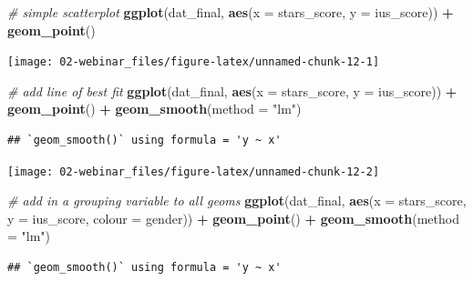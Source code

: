\documentclass[
  oneside]{book}
\newenvironment{Shaded}{\begin{snugshade}}{\end{snugshade}}
\newcommand{\AttributeTok}[1]{\textcolor[rgb]{0.13,0.29,0.53}{#1}}
\newcommand{\CommentTok}[1]{\textcolor[rgb]{0.56,0.35,0.01}{\textit{#1}}}
\newcommand{\FunctionTok}[1]{\textcolor[rgb]{0.13,0.29,0.53}{\textbf{#1}}}
\newcommand{\NormalTok}[1]{#1}
\newcommand{\SpecialCharTok}[1]{\textcolor[rgb]{0.81,0.36,0.00}{\textbf{#1}}}
\newcommand{\StringTok}[1]{\textcolor[rgb]{0.31,0.60,0.02}{#1}}
\begin{document}
\begin{Shaded}
\begin{Highlighting}[]
\CommentTok{\# simple scatterplot}
\FunctionTok{ggplot}\NormalTok{(dat\_final, }\FunctionTok{aes}\NormalTok{(}\AttributeTok{x =}\NormalTok{ stars\_score, }\AttributeTok{y =}\NormalTok{ ius\_score)) }\SpecialCharTok{+}
  \FunctionTok{geom\_point}\NormalTok{()}
\end{Highlighting}
\end{Shaded}

\begin{center}\texttt{[image: 02-webinar\_files/figure-latex/unnamed-chunk-12-1]} \end{center}

\begin{Shaded}
\begin{Highlighting}[]
\CommentTok{\# add line of best fit}
\FunctionTok{ggplot}\NormalTok{(dat\_final, }\FunctionTok{aes}\NormalTok{(}\AttributeTok{x =}\NormalTok{ stars\_score, }\AttributeTok{y =}\NormalTok{ ius\_score)) }\SpecialCharTok{+}
  \FunctionTok{geom\_point}\NormalTok{() }\SpecialCharTok{+}
  \FunctionTok{geom\_smooth}\NormalTok{(}\AttributeTok{method =} \StringTok{"lm"}\NormalTok{)}
\end{Highlighting}
\end{Shaded}

\begin{verbatim}
## `geom_smooth()` using formula = 'y ~ x'
\end{verbatim}

\begin{center}\texttt{[image: 02-webinar\_files/figure-latex/unnamed-chunk-12-2]} \end{center}

\begin{Shaded}
\begin{Highlighting}[]
\CommentTok{\# add in a grouping variable to all geoms}
\FunctionTok{ggplot}\NormalTok{(dat\_final, }\FunctionTok{aes}\NormalTok{(}\AttributeTok{x =}\NormalTok{ stars\_score, }\AttributeTok{y =}\NormalTok{ ius\_score, }\AttributeTok{colour =}\NormalTok{ gender)) }\SpecialCharTok{+}
  \FunctionTok{geom\_point}\NormalTok{() }\SpecialCharTok{+}
  \FunctionTok{geom\_smooth}\NormalTok{(}\AttributeTok{method =} \StringTok{"lm"}\NormalTok{)}
\end{Highlighting}
\end{Shaded}

\begin{verbatim}
## `geom_smooth()` using formula = 'y ~ x'
\end{verbatim}
\end{document}
